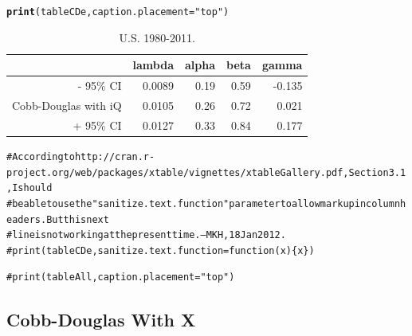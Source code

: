 \documentclass[preprint,authoryear,12pt]{elsarticle}\usepackage{graphicx, color}
\makeatletter
\newcommand{\hlfunctioncall}[1]{\textcolor[rgb]{0.501960784313725,0,0.329411764705882}{\textbf{#1}}}%
\newcommand{\hlstring}[1]{\textcolor[rgb]{0.6,0.6,1}{#1}}%
\newcommand{\hlcomment}[1]{\textcolor[rgb]{0.180392156862745,0.6,0.341176470588235}{#1}}%
\newenvironment{kframe}{%
 \def\at@end@of@kframe{}%
 \ifinner\ifhmode%
  \def\at@end@of@kframe{\end{minipage}}%
  \begin{minipage}{\columnwidth}%
 \fi\fi%
 \def\FrameCommand##1{\hskip\@totalleftmargin \hskip-\fboxsep
 \colorbox{shadecolor}{##1}\hskip-\fboxsep
     \hskip-\linewidth \hskip-\@totalleftmargin \hskip\columnwidth}%
 \MakeFramed {\advance\hsize-\width
   \@totalleftmargin\z@ \linewidth\hsize
   \@setminipage}}%
 {\par\unskip\endMakeFramed%
 \at@end@of@kframe}
\makeatother
\begin{document}
\begin{kframe}
\begin{alltt}

\hlfunctioncall{print}(tableCDe, caption.placement=\hlstring{"top"})
\end{alltt}
\end{kframe}%
\begin{table}[ht]
\begin{center}
\caption{U.S. 1980-2011.}
\begin{tabular}{rrrrr}
  \hline
 & lambda & alpha & beta & gamma \\ 
  \hline
- 95\% CI & 0.0089 & 0.19 & 0.59 & -0.135 \\ 
  Cobb-Douglas with iQ & 0.0105 & 0.26 & 0.72 & 0.021 \\ 
  + 95\% CI & 0.0127 & 0.33 & 0.84 & 0.177 \\ 
   \hline
\end{tabular}
\end{center}
\end{table}
\begin{kframe}\begin{alltt}
\hlcomment{# According to http://cran.r-project.org/web/packages/xtable/vignettes/xtableGallery.pdf, Section 3.1, I should }
\hlcomment{# be able to use the "sanitize.text.function" parameter to allow markup in column headers. But this next}
\hlcomment{# line is not working at the present time. --MKH, 18 Jan 2012.}
\hlcomment{# print(tableCDe, sanitize.text.function = function(x)\{x\})}

\hlcomment{#print(tableAll, caption.placement="top")}
\end{alltt}
\end{kframe}


\subsection{Cobb-Douglas With X}
\end{document}
